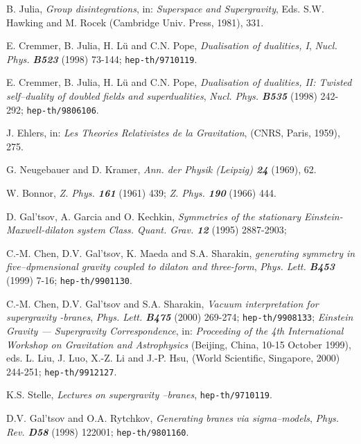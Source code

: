 \documentclass[a4paper,12pt]{article}
\begin{document}
\begin{thebibliography}{99}
    B. Julia,
    {\sl Group disintegrations},
    in: {\it Superspace and Supergravity},
    Eds. S.W. Hawking and M. Rocek (Cambridge Univ. Press, 1981), 331.

    E. Cremmer, B. Julia, H. L\"u and C.N. Pope,
    {\sl Dualisation of dualities, I},
    {\it Nucl. Phys. \bf B523} (1998) 73-144;
    {\tt hep-th/9710119}.

    E. Cremmer, B. Julia, H. L\"u and C.N. Pope,
    {\sl Dualisation of dualities, II: Twisted self--duality of doubled
         fields and superdualities},
    {\it Nucl. Phys. \bf B535} (1998) 242-292;
    {\tt hep-th/9806106}.

    J. Ehlers,
    in: {\it Les Theories Relativistes de la Gravitation},
    (CNRS, Paris, 1959), 275.

    G. Neugebauer and D. Kramer,
    {\it Ann. der Physik (Leipzig) \bf 24} (1969), 62.

    W. Bonnor,
    {\sl Z. Phys. \bf 161} (1961) 439; {\sl Z. Phys. \bf 190} (1966) 444.

    D. Gal'tsov, A. Garcia and O. Kechkin,
    {\sl Symmetries of the stationary Einstein-Maxwell-dilaton system}
    {\it Class. Quant. Grav. \bf 12} (1995) 2887-2903;

    C.-M. Chen, D.V. Gal'tsov, K. Maeda and S.A. Sharakin,
    {\sl {}\coordHE{} generating symmetry in five--dpmensional gravity coupled
         to dilaton and three-form},
    {\it Phys. Lett. \bf B453} (1999) 7-16;
    {\tt hep-th/9901130}.

    C.-M. Chen, D.V. Gal'tsov and S.A. Sharakin,
    {\sl Vacuum interpretation for supergravity \coordHE{}-branes},
    {\it Phys. Lett. \bf B475} (2000) 269-274;
    {\tt hep-th/9908133}; {\sl Einstein Gravity --- Supergravity Correspondence},
    in: {\it Proceeding of the 4th International Workshop on
             Gravitation and Astrophysics}
    (Beijing, China, 10-15 October 1999),
    eds. L. Liu, J. Luo, X.-Z. Li and J.-P. Hsu,
    (World Scientific, Singapore, 2000) 244-251;
    {\tt hep-th/9912127}.

    K.S. Stelle,
    {\sl Lectures on supergravity \coordHE{}--branes},
    {\tt hep-th/9710119}.

    D.V. Gal'tsov and O.A. Rytchkov,
    {\sl Generating branes via sigma--models},
    {\it Phys. Rev. \bf D58} (1998) 122001;
    {\tt hep-th/9801160}.


\end{thebibliography}
\end{document}

